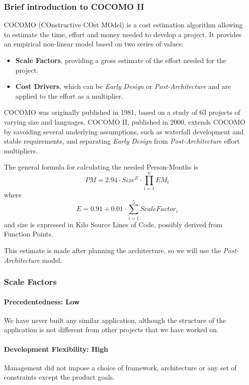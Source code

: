 \clearpage
\subsubsection{Brief introduction to COCOMO II}
COCOMO (COnstructive COst MOdel) is a cost estimation algorithm allowing to estimate the time, effort and money needed to develop a project. It provides an empirical non-linear model based on two series of values:
\begin{itemize}
	\item\textbf{Scale Factors}, providing a gross estimate of the effort needed for the project.
	\item\textbf{Cost Drivers}, which can be \textit{Early Design} or \textit{Post-Architecture} and are applied to the effort as a multiplier.
\end{itemize}
COCOMO was originally published in 1981, based on a study of 63 projects of varying size and languages. COCOMO II, published in 2000, extends COCOMO by savoiding several underlying assumptions, such as waterfall development and stable requirements, and separating \textit{Early Design} from \textit{Post-Architecture} effort multipliers.

The general formula for calculating the needed Person-Months is $$ PM = 2.94 \cdot Size^E \cdot \prod_{i=1}^{n} EM_i $$ where $$ E = 0.91 + 0.01 \cdot \sum_{i=1}^{5}ScaleFactor_i $$ and size is expressed in Kilo Source Lines of Code, possibly derived from Function Points.

This estimate is made after planning the architecture, so we will use the \textit{Post-Architecture} model.

\subsubsection{Scale Factors}
\paragraph*{Precedentedness: Low}
We have never built any similar application, although the structure of the application is not different from other projects that we have worked on.

\paragraph*{Development Flexibility: High}
Management did not impose a choice of framework, architecture or any set of constraints except the product goals.

